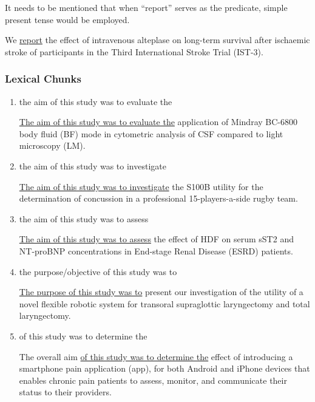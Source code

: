 \documentclass{ctexbook}
\begin{document}
    
    It needs to be mentioned that when ``report'' serves as the predicate, simple present tense would be employed.

    \begin{eg}{}
      We \uline{report} the effect of intravenous alteplase on long-term survival after ischaemic stroke of participants in the Third International Stroke Trial (IST-3).
    \end{eg}

    \subsubsection{Lexical Chunks}

    \begin{enumerate}
      \item the aim of this study was to evaluate the
      \begin{eg}{}
        \uline{The aim of this study was to evaluate the} application of Mindray BC-6800 body fluid (BF) mode in cytometric analysis of CSF compared to light microscopy (LM).
      \end{eg}

      \item the aim of this study was to investigate
      \begin{eg}{}
        \uline{The aim of this study was to investigate} the S100B utility for the determination of concussion in a professional 15-players-a-side rugby team.
      \end{eg}

      \item the aim of this study was to assess
      \begin{eg}{}
        \uline{The aim of this study was to assess} the effect of HDF on serum sST2 and NT-proBNP concentrations in End-stage Renal Disease (ESRD) patients.
      \end{eg}

      \item the purpose/objective of this study was to
      \begin{eg}{}
        \uline{The purpose of this study was to} present our investigation of the utility of a novel flexible robotic system for transoral supraglottic laryngectomy and total laryngectomy.
      \end{eg}

      \item of this study was to determine the
      \begin{eg}{}
        The overall aim \uline{of this study was to determine the} effect of introducing a smartphone pain application (app), for both Android and iPhone devices that enables chronic pain patients to assess, monitor, and communicate their status to their providers.
      \end{eg}


\end{enumerate}
\end{document}
